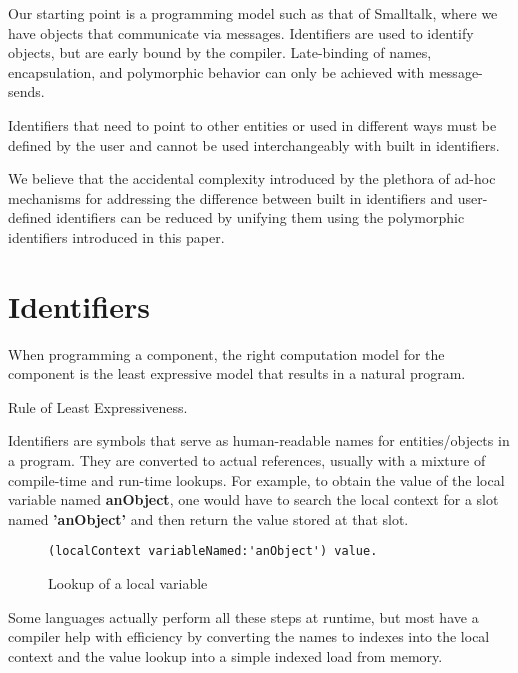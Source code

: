 \documentclass[preprint,authoryear]{acm_proc_article-sp}
\begin{document}
Our starting point is a programming model such as that of Smalltalk, where we have objects
that communicate via messages\cite{Goldberg1983}.   Identifiers are used to identify 
objects, but are early bound by the compiler.  Late-binding of names, encapsulation,
and polymorphic behavior can only be achieved with message-sends.

Identifiers that need to point to other entities or used in different ways must be defined
by the user and cannot be used interchangeably with built in identifiers.  

We believe that the accidental complexity \cite{Brooks87nosilver} introduced by the
plethora of ad-hoc mechanisms for addressing the difference between built in 
identifiers and user-defined identifiers can be reduced 
by unifying them using the polymorphic identifiers introduced in this paper.


\section{Identifiers}
\label{identifiers}
\epigraph{When programming a component, the right computation model for the component is the least expressive model that results in a natural program.}{Rule of Least Expressiveness.}

Identifiers are symbols that serve as human-readable names for entities/objects
in a program.  They are converted to actual references, usually with a mixture of
compile-time and run-time lookups.  For example, to obtain the value of the local
variable named {\bf anObject}, one would have to search the local context for
a slot named {\bf 'anObject'} and then return the value stored at that slot.


\begin{small}
\begin{figure}[htbp]
\begin{center}
\begin{small}
\begin{verbatim}
(localContext variableNamed:'anObject') value.
\end{verbatim}
\end{small}
\end{center}
\caption{Lookup of a local variable}
\label{variable-lookup}
\end{figure}
\end{small}

Some  languages actually perform all these steps at runtime, but most 
have a compiler help with efficiency by converting the names to indexes into
the local context and the value lookup into a simple indexed load from memory.
\end{document}
